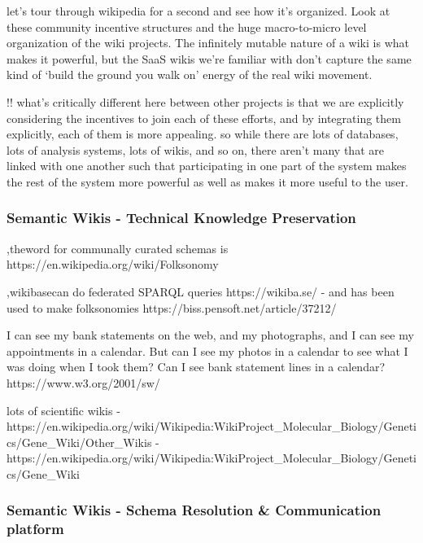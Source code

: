 \documentclass[nohyper]{tufte-book-jls}
\begin{document}
\begin{leftbar}
let's tour through wikipedia for a second and see how it's organized.
Look at these community incentive structures and the huge macro-to-micro
level organization of the wiki projects. The infinitely mutable nature
of a wiki is what makes it powerful, but the SaaS wikis we're familiar
with don't capture the same kind of `build the ground you walk on'
energy of the real wiki movement.
\end{leftbar}

!! what's critically different here between other projects is that we
are explicitly considering the incentives to join each of these efforts,
and by integrating them explicitly, each of them is more appealing. so
while there are lots of databases, lots of analysis systems, lots of
wikis, and so on, there aren't many that are linked with one another
such that participating in one part of the system makes the rest of the
system more powerful as well as makes it more useful to the user.

\hypertarget{semantic-wikis---technical-knowledge-preservation}{%
\subsubsection{Semantic Wikis - Technical Knowledge
Preservation}\label{semantic-wikis---technical-knowledge-preservation}}

\cite{kamelboulosSemanticWikisComprehensible2009},theword for communally curated schemas is
https://en.wikipedia.org/wiki/Folksonomy

\cite{goodSocialTaggingLife2009},wikibasecan do federated SPARQL queries https://wikiba.se/ - and has
been used to make folksonomies https://biss.pensoft.net/article/37212/

\begin{leftbar}
I can see my bank statements on the web, and my photographs, and I can
see my appointments in a calendar. But can I see my photos in a calendar
to see what I was doing when I took them? Can I see bank statement lines
in a calendar? https://www.w3.org/2001/sw/
\end{leftbar}

lots of scientific wikis -
https://en.wikipedia.org/wiki/Wikipedia:WikiProject\_Molecular\_Biology/Genetics/Gene\_Wiki/Other\_Wikis
-
https://en.wikipedia.org/wiki/Wikipedia:WikiProject\_Molecular\_Biology/Genetics/Gene\_Wiki

\hypertarget{semantic-wikis---schema-resolution-communication-platform}{%
\subsubsection{Semantic Wikis - Schema Resolution \& Communication
platform}\label{semantic-wikis---schema-resolution-communication-platform}}
\end{document}
